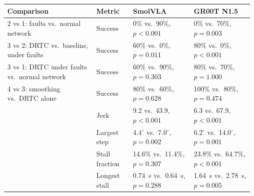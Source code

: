 \begin{tabular}{l l l l}
\toprule
Comparison & Metric & SmolVLA & GR00T N1.5 \\
\midrule
2 vs 1: faults vs.\ normal network & Success & 0\% vs.\ 90\%, $p<0.001$ & 0\% vs.\ 70\%, $p=0.003$ \\
3 vs 2: DRTC vs.\ baseline, under faults & Success & 60\% vs.\ 0\%, $p=0.011$ & 80\% vs.\ 0\%, $p<0.001$ \\
3 vs 1: DRTC under faults vs.\ normal network & Success & 60\% vs.\ 90\%, $p=0.303$ & 80\% vs.\ 70\%, $p=1.000$ \\
4 vs 3: smoothing vs.\ DRTC alone & Success & 80\% vs.\ 60\%, $p=0.628$ & 100\% vs.\ 80\%, $p=0.474$ \\
\addlinespace
 & Jerk & 9.2 vs.\ 43.9, $p<0.001$ & 6.3 vs.\ 67.9, $p<0.001$ \\
 & Largest step & 4.4$^\circ$ vs.\ 7.0$^\circ$, $p=0.002$ & 6.2$^\circ$ vs.\ 14.0$^\circ$, $p=0.001$ \\
 & Stall fraction & 14.6\% vs.\ 11.4\%, $p=0.307$ & 23.8\% vs.\ 64.7\%, $p<0.001$ \\
 & Longest stall & 0.74~s vs.\ 0.64~s, $p=0.288$ & 1.64~s vs.\ 2.78~s, $p=0.005$ \\
\bottomrule
\end{tabular}
